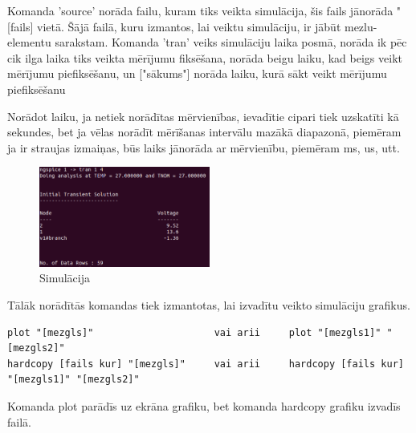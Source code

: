 \documentclass{article}
\begin{document}
Komanda {\Large \textsf{'source'}} norāda failu, kuram tiks veikta simulācija, šis fails jānorāda {\large \textsf{"[fails]}} vietā. Šājā failā, kuru izmantos, lai veiktu simulāciju, ir jābūt mezlu-elementu sarakstam.\newline
Komanda 'tran' veiks simulāciju laika posmā,  norāda ik pēc cik ilga laika tiks veikta mērījumu fiksēšana, \newline{\large \textsf{["beigas"]}} norāda beigu laiku, kad beigs veikt mērījumu piefiksēšanu, \newline un {\large \textsf{["sākums"]}} norāda laiku, kurā sākt veikt mērījumu piefiksēšanu 

Norādot laiku, ja netiek norādītas mērvienības, ievadītie cipari tiek uzskatīti kā sekundes, bet ja vēlas norādīt mērīšanas intervālu mazākā diapazonā, piemēram ja ir straujas izmaiņas, būs laiks jānorāda ar mērvienību, piemēram ms, us, utt.

\begin{figure}[H]\centering\includegraphics[width=0.5\textwidth]{pictures/spice/Simulacija.PNG}\caption{Simulācija}\label{picture:10lw13p}\end{figure}


Tālāk norādītās komandas tiek izmantotas, lai izvadītu veikto simulāciju grafikus.

\begin{lstlisting}
plot "[mezgls]"                     vai arii     plot "[mezgls1]" "[mezgls2]" 
hardcopy [fails kur] "[mezgls]"     vai arii     hardcopy [fails kur] "[mezgls1]" "[mezgls2]"
\end{lstlisting}

Komanda plot parādīs uz ekrāna grafiku, bet komanda hardcopy grafiku izvadīs failā.
\end{document}

